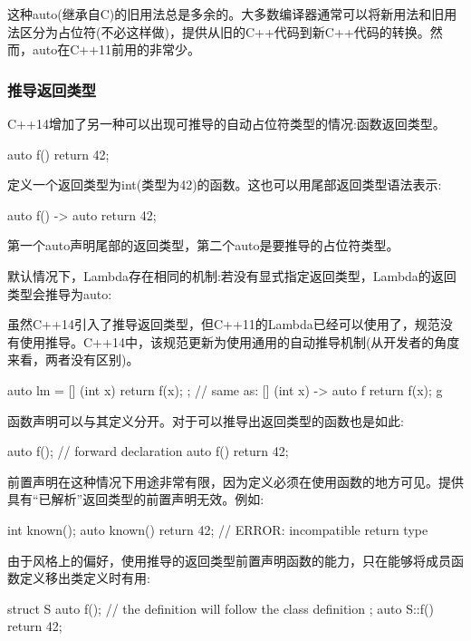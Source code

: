 这种auto(继承自C)的旧用法总是多余的。大多数编译器通常可以将新用法和旧用法区分为占位符(不必这样做)，提供从旧的C++代码到新C++代码的转换。然而，auto在C++11前用的非常少。

\subsubsection{推导返回类型}

C++14增加了另一种可以出现可推导的自动占位符类型的情况:函数返回类型。

\begin{cpp}
auto f() { return 42; }
\end{cpp}

定义一个返回类型为int(类型为42)的函数。这也可以用尾部返回类型语法表示:

\begin{cpp}
auto f() -> auto { return 42; }
\end{cpp}

第一个auto声明尾部的返回类型，第二个auto是要推导的占位符类型。

默认情况下，Lambda存在相同的机制:若没有显式指定返回类型，Lambda的返回类型会推导为auto:

\begin{notice}
虽然C++14引入了推导返回类型，但C++11的Lambda已经可以使用了，规范没有使用推导。C++14中，该规范更新为使用通用的自动推导机制(从开发者的角度来看，两者没有区别)。
\end{notice}

\begin{cpp}
auto lm = [] (int x) { return f(x); };
// same as: [] (int x) -> auto f return f(x); g
\end{cpp}

函数声明可以与其定义分开。对于可以推导出返回类型的函数也是如此:

\begin{cpp}
auto f(); // forward declaration
auto f() { return 42; }
\end{cpp}

前置声明在这种情况下用途非常有限，因为定义必须在使用函数的地方可见。提供具有“已解析”返回类型的前置声明无效。例如:

\begin{cpp}
int known();
auto known() { return 42; } // ERROR: incompatible return type
\end{cpp}

由于风格上的偏好，使用推导的返回类型前置声明函数的能力，只在能够将成员函数定义移出类定义时有用:

\begin{cpp}
struct S {
	auto f(); // the definition will follow the class definition
};
auto S::f() { return 42; }
\end{cpp}

